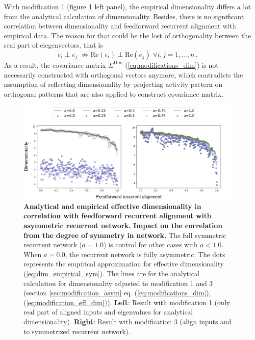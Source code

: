 \documentclass[11pt]{article}
\begin{document}
	With modification 1 (figure \ref{fig:dim_asym} left panel), the empirical dimensionality differs a lot from the analytical calculation of dimensionality. Besides, there is no significant correlation between dimensionality and feedforward recurrent alignment with empirical data. The reason for that could be the lost of orthogonality between the real part of eiegenvectors, that is 
	\begin{equation}
		e_i \perp e_j  \, \, \nRightarrow \text{Re}(e_i) \perp \text{Re}(e_j) \, \, \forall i, j = 1, ..., n \, .
	\end{equation}
	As a result, the covariance matrix $\Sigma^{\text{Dim}}$ (\ref{eq:modifications_dim}) is not necessarily constructed with orthogonal vectors anymore, which contradicts the assumption of reflecting dimensionality by projecting activity pattern on orthogonal patterns that are also applied to construct covariance matrix. 
	
		\begin{figure}[H]
			\centering
			\includegraphics[width=\textwidth]{../figures/dim_asym.pdf}
			\caption{\textbf{Analytical and empirical effective dimensionality in correlation with feedforward recurrent alignment with asymmetric recurrent network. Impact on the correlation from the degree of symmetry in network.} The full symmetric recurrent network ($a = 1.0$) is control for other cases with $a < 1.0$. When $a = 0.0$, the recurrent network is fully asymmetric. The dots represents the empirical approximation for effective dimensionality (\ref{eq:dim_empirical_sym}). The lines are for the analytical calculation for dimensionality adjusted to modification 1 and 3 (section \ref{sec:modification_asym} eq. (\ref{eq:modifications_dim}), (\ref{eq:modification_eff_dim})). \textbf{Left}: Result with modification 1 (only real part of aligned inputs and eigenvalues for analytical dimensionality). \textbf{Right}: Result with modification 3 (align inputs and to symmetrized recurrent network).}
			\label{fig:dim_asym}
		\end{figure}
	
\end{document}
